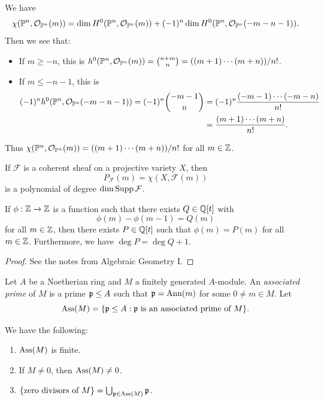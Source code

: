 \begin{example}
  We have
  \[\chi(\mathbb{P}^n, \mathcal{O}_{\mathbb{P}^n}(m)) = \dim H^0(\mathbb{P}^n, \mathcal{O}_{\mathbb{P}^n}(m)) + (-1)^n \dim H^0(\mathbb{P}^n, \mathcal{O}_{\mathbb{P}^n}(-m - n - 1)).\]
  Then we see that:
  \begin{itemize}
    \item If $m \ge -n$, this is
      $h^0(\mathbb{P}^n, \mathcal{O}_{\mathbb{P}^n}(m)) = \binom{n + m}{n} = ((m + 1) \cdots (m + n)) / n!$.
    \item If $m \le - n - 1$, this is
      \begin{align*}
        (-1)^n
        h^0(\mathbb{P}^n, \mathcal{O}_{\mathbb{P}^n}(-m - n - 1))
        = (-1)^n \binom{-m - 1}{n}
        &= (-1)^n \frac{(-m - 1) \cdots (-m - n)}{n!} \\
        &= \frac{(m + 1) \cdots (m + n)}{n!}.
      \end{align*}
  \end{itemize}
  Thus $\chi(\mathbb{P}^n, \mathcal{O}_{\mathbb{P}^n}(m)) = ((m + 1) \cdots (m + n)) / n!$ for all $m \in \mathbb{Z}$.
\end{example}

\begin{theorem}\label{thm:hilbertpolynomial}
  If $\mathcal{F}$ is a coherent
  sheaf on a projective variety $X$, then
  \[
    P_{\mathcal{F}}(m)
    = \chi(X, \mathcal{F}(m))
  \]
  is a polynomial of degree $\dim \operatorname{Supp} \mathcal{F}$.
\end{theorem}

\begin{lemma}\label{lem:polynomial}
  If $\phi : \mathbb{Z} \to \mathbb{Z}$ is a function such
  that there exists $Q \in \mathbb{Q}[t]$ with
  \[
    \phi(m) - \phi(m - 1) = Q(m)
  \]
  for all $m \in \mathbb{Z}$, then
  there exists $P \in \mathbb{Q}[t]$ such that
  $\phi(m) = P(m)$ for all $m \in \mathbb{Z}$.
  Furthermore, we have $\deg P = \deg Q + 1$.
\end{lemma}

\begin{proof}
  See the notes from Algebraic Geometry I.
\end{proof}

\begin{definition}
  Let $A$ be a Noetherian ring and
  $M$ a finitely generated $A$-module.
  An \emph{associated prime} of $M$ is a
  prime $\mathfrak{p} \le A$ such that
  $\mathfrak{p} = \operatorname{Ann}(m)$ for some $0 \ne m \in M$. Let
  \[
    \operatorname{Ass}(M)
    = \{\mathfrak{p} \le A : \mathfrak{p} \text{ is an associated prime of } M\}.
  \]
\end{definition}

\begin{theorem}
  We have the following:
  \begin{enumerate}
    \item $\operatorname{Ass}(M)$ is finite.
    \item If $M \ne 0$, then $\operatorname{Ass}(M) \ne 0$.
    \item $\{\text{zero divisors of } M\} = \bigcup_{\mathfrak{p} \in \operatorname{Ass}(M)} \mathfrak{p}$.
  \end{enumerate}
\end{theorem}

